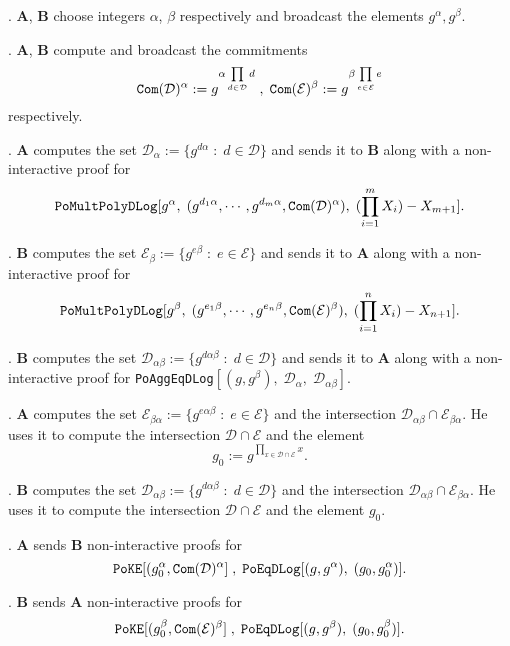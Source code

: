 \documentclass[11pt, lettersize, notitlepage, leqno, footskip=0.6cm]{article}
\newcommand{\pl}{\prod\limits}
\newcommand{\mc}{\mathcal}
\newcommand{\mbf}{\mathbf}
\newcommand{\al}{\alpha}
\newcommand{\be}{\beta}
\newcommand{\vs}{\vspace{-0.15cm}}
\newcommand{\noin}{\noindent}
\numberwithin{equation}{section}
\begin{document}
{\noin 1. $\mbf{A}$, $\mbf{B}$ choose integers $\al$, $\be$ respectively and broadcast the elements $g^{\al}, g^{\be}$.

\noin 2.  $\mbf{A}$, $\mbf{B}$ compute and broadcast the commitments \vs $$\protect{\verb|Com|}(\mc{D})^{\al}:= g^{\al\pl_{d\in\mc{D}} d }\;,\; \protect{\verb|Com|}(\mc{E})^{\be}:=  g^{\be\pl_{e\in\mc{E}} e } $$ respectively. 

\noin 3. $\mbf{A}$ computes the set $\mc{D}_{\al} := \{g^{ d\al}\;:\; d\in\mc{D}\}$ and sends it to $\mbf{B}$ along with a non-interactive proof for \vs $$\protect{\verb|PoMultPolyDLog|}[g^{\al},\;(g^{d_1\al},\cdots, g^{d_m\al},\protect{\verb|Com|}(\mc{D})^{\al}),\; (\pl_{i=1}^m X_i)-X_{m+1}].$$ 

\noin 4. $\mbf{B}$ computes the set $\mc{E}_{\be}:= \{g^{ e\be}\;:\; e\in\mc{E}\}$ and sends it to $\mbf{A}$ along with a non-interactive proof for \vs $$\protect{\verb|PoMultPolyDLog|}[g^{\be},\;(g^{e_1\be},\cdots, g^{e_n\be},\protect{\verb|Com|}(\mc{E})^{\be}),\; (\pl_{i=1}^n X_i)-X_{n+1}].$$

\noin 5. $\mbf{B}$ computes the set $\mc{D}_{\al\be}:= \{g^{ d\al\be}\;:\; d\in\mc{D}\}$ and sends it to $\mbf{A}$ along with a non-interactive proof for \verb|PoAggEqDLog|$[(g, g^{\be}),\;\mc{D}_{\al},\;\mc{D}_{\al\be}]$.  

\noin 6. $\mbf{A}$ computes the set $\mc{E}_{\be\al}:= \{g^{ e\al\be}\;:\; e\in\mc{E}\}$ and the intersection $\mc{D}_{\al\be}\cap \mc{E}_{\be\al}$. He uses it to compute the intersection $\mc{D}\cap \mc{E}$ and the element \vs $$g_0:= g^{\pl_{x\in \mc{D}\cap \mc{E}} x}.$$

\noin 7. $\mbf{B}$ computes the set $\mc{D}_{\al\be}:= \{g^{ d\al\be}\;:\; d\in\mc{D}\}$ and the intersection $\mc{D}_{\al\be}\cap \mc{E}_{\be\al}$. He uses it to compute the intersection $\mc{D}\cap \mc{E}$ and the element $g_0$.

\noin 8. $\mbf{A}$ sends $\mbf{B}$ non-interactive proofs for \vs $$\protect{\verb|PoKE|}[(g_0^{\al}, \protect{\verb|Com|}(\mc{D})^{\al}]\;,\;\protect{\verb|PoEqDLog|}[(g,g^{\al}),\; (g_0, g_0^{\al})].$$ 

\noin 9. $\mbf{B}$ sends $\mbf{A}$ non-interactive proofs for \vs $$\protect{\verb|PoKE|}[(g_0^{\be}, \protect{\verb|Com|}(\mc{E})^{\be}]\;,\;\protect{\verb|PoEqDLog|}[(g,g^{\be}),\; (g_0, g_0^{\be})].$$ 





















}
\end{document}
